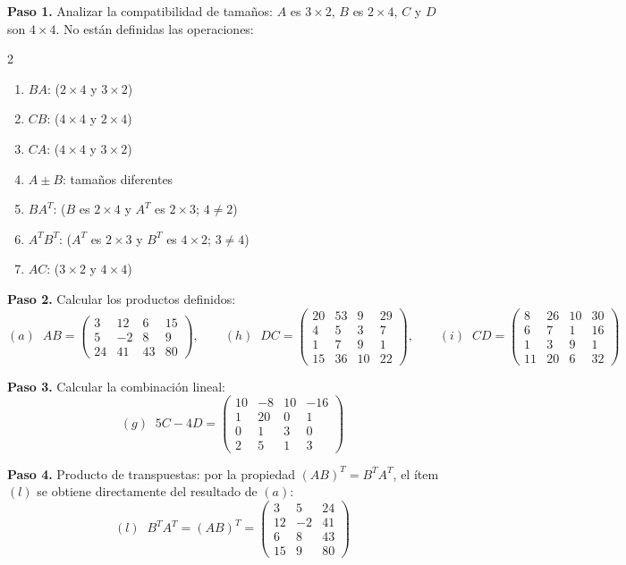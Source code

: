 \begin{example}
\begin{myproof}
\textbf{Paso 1.} Analizar la compatibilidad de tamaños: $A$ es $3\times 2$, $B$ es $2\times 4$, $C$ y $D$ son $4\times 4$. No están definidas las operaciones:
\begin{multicols}{2}
\begin{enumerate}
    \item[$(b)$] $BA$: ($2 \times 4$ y $3 \times 2$)
    \item[$(c)$] $CB$: ($4 \times 4$ y $2 \times 4$)
    \item[$(d)$,$(n)$] $CA$: ($4 \times 4$ y $3 \times 2$)
    \item[$(e)$,$(f)$] $A \pm B$: tamaños diferentes
    \item[$(j)$] $BA^T$: ($B$ es $2\times 4$ y $A^T$ es $2\times 3$; $4\neq 2$)
    \item[$(k)$] $A^TB^T$: ($A^T$ es $2\times 3$ y $B^T$ es $4\times 2$; $3\neq 4$)
    \item[$(m)$] $AC$: ($3 \times 2$ y $4 \times 4$)
\end{enumerate}
\end{multicols}

\textbf{Paso 2.} Calcular los productos definidos:
\[
(a)\;\; AB = \begin{pmatrix} 3 & 12 & 6 & 15 \\ 5 & -2 & 8 & 9 \\ 24 & 41 & 43 & 80 \end{pmatrix}, \qquad
(h)\;\; DC = \begin{pmatrix} 20 & 53 & 9 & 29 \\ 4 & 5 & 3 & 7 \\ 1 & 7 & 9 & 1 \\ 15 & 36 & 10 & 22 \end{pmatrix}, \qquad
(i)\;\; CD = \begin{pmatrix} 8 & 26 & 10 & 30 \\ 6 & 7 & 1 & 16 \\ 1 & 3 & 9 & 1 \\ 11 & 20 & 6 & 32 \end{pmatrix}
\]

\textbf{Paso 3.} Calcular la combinación lineal:
\[
(g)\;\; 5C - 4D = \begin{pmatrix} 10 & -8 & 10 & -16 \\ 1 & 20 & 0 & 1 \\ 0 & 1 & 3 & 0 \\ 2 & 5 & 1 & 3 \end{pmatrix}
\]

\textbf{Paso 4.} Producto de transpuestas: por la propiedad $(AB)^T = B^T A^T$, el ítem $(l)$ se obtiene directamente del resultado de $(a)$:
\[
(l)\;\; \boxed{B^TA^T = (AB)^T = \begin{pmatrix} 3 & 5 & 24 \\ 12 & -2 & 41 \\ 6 & 8 & 43 \\ 15 & 9 & 80 \end{pmatrix}}
\]
\end{myproof}
\end{example}

